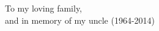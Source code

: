 %
%
%
%




\begin{center}
\vspace*{\fill}
To my loving family,\\
and in memory of my uncle (1964-2014)
\vspace{6in}
\end{center}

\pagebreak{}
